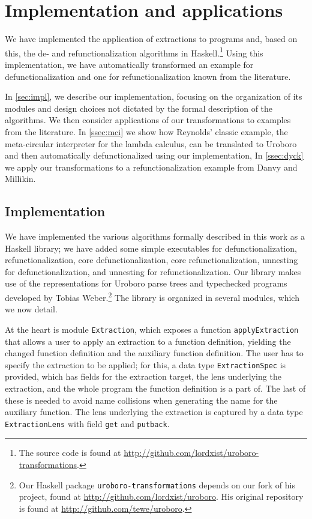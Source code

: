 \chapter{Implementation and applications}
\label{ch:impl}

We have implemented the application of extractions to programs and, based on this, the de- and refunctionalization algorithms in Haskell.\footnote{The source code is found at \url{http://github.com/lordxist/uroboro-transformations}.} Using this implementation, we have automatically transformed an example for defunctionalization and one for refunctionalization known from the literature.

In \autoref{sec:impl}, we describe our implementation, focusing on the organization of its modules and design choices not dictated by the formal description of the algorithms. We then consider applications of our transformations to examples from the literature. In \autoref{ssec:mci} we show how Reynolds' classic example, the meta-circular interpreter for the lambda calculus, can be translated to Uroboro and then automatically defunctionalized using our implementation, In \autoref{ssec:dyck} we apply our transformations to a refunctionalization example from Danvy and Millikin.

\section{Implementation}
\label{sec:impl}

We have implemented the various algorithms formally described in this work as a Haskell library; we have added some simple executables for defunctionalization, refunctionalization, core defunctionalization, core refunctionalization, unnesting for defunctionalization, and unnesting for refunctionalization. Our library makes use of the representations for Uroboro parse trees and typechecked programs developed by Tobias Weber.\footnote{Our Haskell package \texttt{uroboro-transformations} depends on our fork of his project, found at \url{http://github.com/lordxist/uroboro}. His original repository is found at \url{http://github.com/tewe/uroboro}.} The library is organized in several modules, which we now detail.

At the heart is module \texttt{Extraction}, which exposes a function \texttt{applyExtraction} that allows a user to apply an extraction to a function definition, yielding the changed function definition and the auxiliary function definition. The user has to specify the extraction to be applied; for this, a data type \texttt{ExtractionSpec} is provided, which has fields for the extraction target, the lens underlying the extraction, and the whole program the function definition is a part of. The last of these is needed to avoid name collisions when generating the name for the auxiliary function. The lens underlying the extraction is captured by a data type \texttt{ExtractionLens} with field \texttt{get} and \texttt{putback}.

